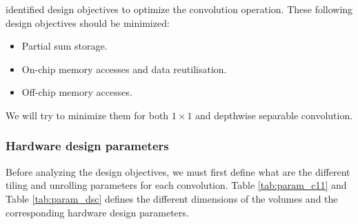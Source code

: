 \textcite{ma_optimizing_2018} identified design objectives to optimize the convolution operation. These following design objectives should be minimized:
%
\begin{itemize}
    \item Partial sum storage.
    \item On-chip memory accesses and data reutilisation.
    \item Off-chip memory accesses.
\end{itemize}
%
We will try to minimize them for both $1 \times 1$ and depthwise separable convolution.
%
\subsubsection{Hardware design parameters}
%
Before analyzing the design objectives, we must first define what are the different tiling and unrolling parameters for each convolution. Table \ref{tab:param_c11} and Table \ref{tab:param_dsc} defines the different dimensions of the volumes and the corresponding hardware design parameters.

